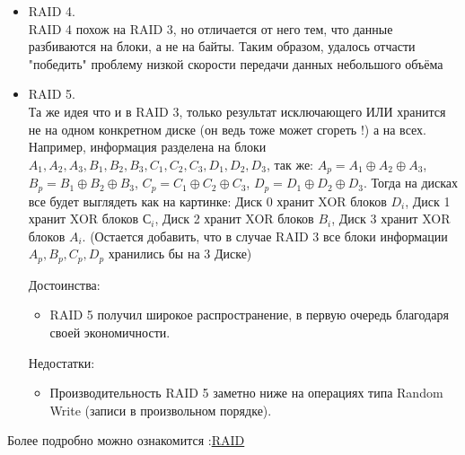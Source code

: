 \begin {itemize}
\begin{figure}[h!]
\begin{minipage}[h]{0.3\linewidth}
\end{minipage}
\hfill
\begin{minipage}[h]{0.3\linewidth}
\end{minipage}
\end{figure}


\item RAID 4. \\
RAID 4 похож на RAID 3, но отличается от него тем, что данные разбиваются на блоки, а не на байты. Таким образом, удалось отчасти "победить" проблему низкой скорости передачи данных небольшого объёма

\item RAID 5. \\
Та же идея что и в RAID 3, только результат исключающего ИЛИ хранится не на одном конкретном диске (он ведь тоже может сгореть !) а на всех. Например, информация разделена на блоки \\ $A_1, A_2, A_3, B_1, B_2, B_3, C_1, C_2, C_3, D_1, D_2, D_3$, так же:
$A_p = A_1 \oplus A_2 \oplus A_3$, 
$B_p = B_1 \oplus B_2 \oplus B_3$, $C_p = C_1 \oplus C_2 \oplus C_3$, $D_p = D_1 \oplus D_2 \oplus D_3$. Тогда на дисках все будет выглядеть как на картинке: Диск 0 хранит XOR блоков $D_i$, Диск 1 хранит XOR блоков $С_i$, Диск 2 хранит XOR блоков $B_i$, Диск 3 хранит XOR блоков $A_i$. (Остается добавить, что в случае RAID 3 все блоки информации $A_p, B_p, C_p, D_p$ хранились бы на 3 Диске)

Достоинства:
\begin {itemize}
\item RAID 5 получил широкое распространение, в первую очередь благодаря своей экономичности. 
\end {itemize}

Недостатки:
\begin {itemize}
\item Производительность RAID 5 заметно ниже на операциях типа Random Write (записи в произвольном порядке).
\end {itemize}
\end {itemize}
Более подробно можно ознакомится :\href{https://clck.ru/dXvaW}{RAID}

